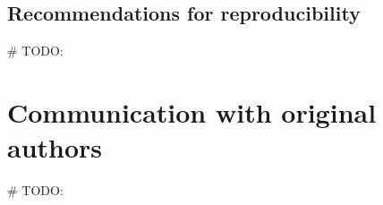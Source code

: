 \documentclass[11pt,a4paper,fleqn]{article}
\begin{document}

\subsection{Recommendations for reproducibility}
\# TODO:

\section{Communication with original authors}
\# TODO:





\end{document}
